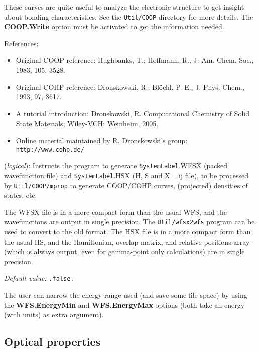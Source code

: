 \documentclass[11pt]{article}
\begin{document}
These curves are quite useful to analyze the electronic structure to
get insight about bonding characteristics. See the {\tt Util/COOP}
directory for more details. The {\bf COOP.Write} option must be
activated to get the information needed.

References:

\begin{itemize}
\item Original COOP reference:
Hughbanks, T.; Hoffmann, R., J. Am. Chem. Soc., 1983, 105, 3528.
\item Original COHP reference: Dronskowski, R.; Blöchl, P. E., J. Phys. Chem., 1993, 97, 8617.
\item A tutorial introduction: Dronskowski, R. Computational Chemistry of Solid State
Materials; Wiley-VCH: Weinheim, 2005.
\item Online material maintained by R. Dronskowski's group: {\tt http://www.cohp.de/}
\end{itemize}

\begin{description}
\itemsep 10pt
\parsep 0pt

\item[{\bf COOP.Write}] ({\it logical}):
Instructs the program to generate  {\tt SystemLabel}.WFSX (packed
wavefunction file) and  {\tt SystemLabel}.HSX (H, S and X\_~{ij} file),
to be processed by {\tt Util/COOP/mprop} to generate COOP/COHP curves,
(projected) densities of states, etc.

The WFSX file is in a more compact form than the usual WFS, and the
wavefunctions are output in single precision. The {\tt Util/wfsx2wfs}
program can be used to convert to the old format.
The HSX file is in a more compact form than the usual HS, and the
Hamiltonian, overlap matrix, and relative-positions array (which is
always output, even for gamma-point only calculations) are in
single precision.

{\it Default value:} {\tt .false.}

The user can narrow the energy-range used (and save some file space)
by using the {\bf WFS.EnergyMin} and {\bf WFS.EnergyMax} options (both take an
energy (with units) as extra argument).

\end{description}


\vspace{5pt}
\subsection{Optical properties}
\end{document}
